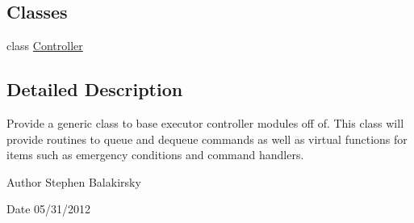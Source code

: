 \subsection*{Classes}
\begin{DoxyCompactItemize}
\item 
class \hyperlink{class_controller}{Controller}
\end{DoxyCompactItemize}


\subsection{Detailed Description}
Provide a generic class to base executor controller modules off of. This class will provide routines to queue and dequeue commands as well as virtual functions for items such as emergency conditions and command handlers. \begin{DoxyAuthor}{Author}
Stephen Balakirsky 
\end{DoxyAuthor}
\begin{DoxyDate}{Date}
05/31/2012 
\end{DoxyDate}
